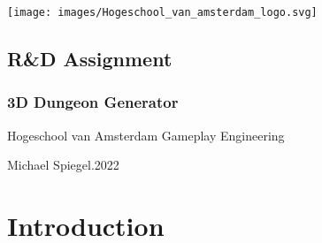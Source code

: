 \documentclass[a4paper,12pt,oneside]{scrreprt}
\begin{document}
\thispagestyle{empty}
\begin{titlepage}
  \begin{flushright}
  \texttt{[image: images/Hogeschool\_van\_amsterdam\_logo.svg]}
  \end{flushright}
  \begin{flushleft}
  \section*{R\&D Assignment}
  \subsection*{3D Dungeon Generator}

  \vspace{1cm}
  Hogeschool van Amsterdam\newline
  Gameplay Engineering

  \vspace{0.5cm}

  Michael Spiegel.2022
  \end{flushleft}
\end{titlepage}

\tableofcontents

\chapter{Introduction}

\clearpage
{}
{}
\listoffigures

\clearpage
{}
{}
\printbibliography
\end{document}
